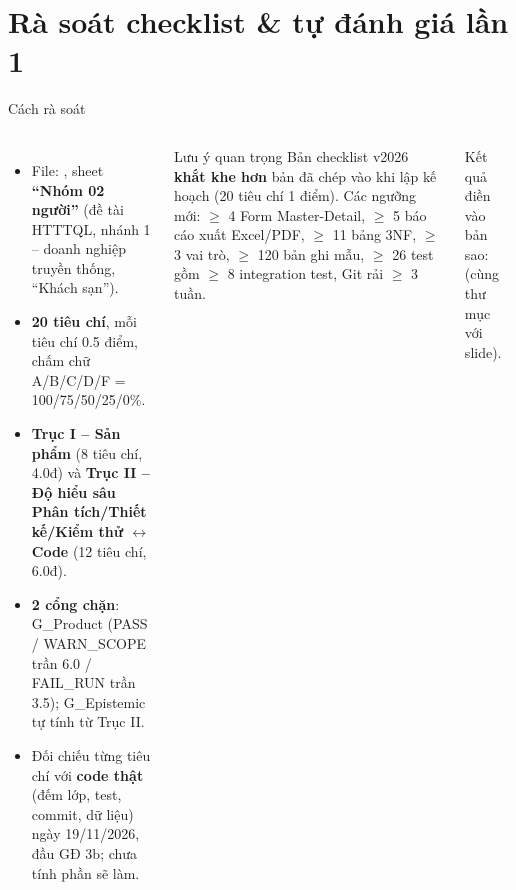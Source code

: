 \section{Rà soát checklist \& tự đánh giá lần 1}

\newcommand{\gA}{\textcolor{okc}{\textbf{A}}}
\newcommand{\gB}{\textcolor{okc!70!black}{\textbf{B}}}
\newcommand{\gC}{\textcolor{midc}{\textbf{C}}}
\newcommand{\gD}{\textcolor{warn}{\textbf{D}}}
\newcommand{\gF}{\textcolor{warn}{\textbf{F}}}

\begin{frame}{Cách rà soát}
\begin{columns}[T]
\scriptsize
\begin{itemize}
  \item File: , sheet \textbf{``Nhóm 02 người''} (đề tài HTTTQL, nhánh 1 -- doanh nghiệp truyền thống, ``Khách sạn'').
  \item \textbf{20 tiêu chí}, mỗi tiêu chí 0.5 điểm, chấm chữ A/B/C/D/F = 100/75/50/25/0\%.
  \item \textbf{Trục I -- Sản phẩm} (8 tiêu chí, 4.0đ) và \textbf{Trục II -- Độ hiểu sâu Phân tích/Thiết kế/Kiểm thử $\leftrightarrow$ Code} (12 tiêu chí, 6.0đ).
  \item \textbf{2 cổng chặn}: G\_Product (PASS / WARN\_SCOPE trần 6.0 / FAIL\_RUN trần 3.5); G\_Epistemic tự tính từ Trục II.
  \item Đối chiếu từng tiêu chí với \textbf{code thật} (đếm lớp, test, commit, dữ liệu) ngày 19/11/2026, đầu GĐ 3b; chưa tính phần sẽ làm.
\end{itemize}
\begin{alertblock}{Lưu ý quan trọng}
\scriptsize
Bản checklist v2026 \textbf{khắt khe hơn} bản đã chép vào  khi lập kế hoạch (20 tiêu chí 1 điểm). Các ngưỡng mới: $\ge$ 4 Form Master-Detail, $\ge$ 5 báo cáo xuất Excel/PDF, $\ge$ 11 bảng 3NF, $\ge$ 3 vai trò, $\ge$ 120 bản ghi mẫu, $\ge$ 26 test gồm $\ge$ 8 integration test, Git rải $\ge$ 3 tuần.
\end{alertblock}
\vspace{1mm}
{\tiny Kết quả điền vào bản sao:  (cùng thư mục với slide).\par}
\end{columns}
\end{frame}

